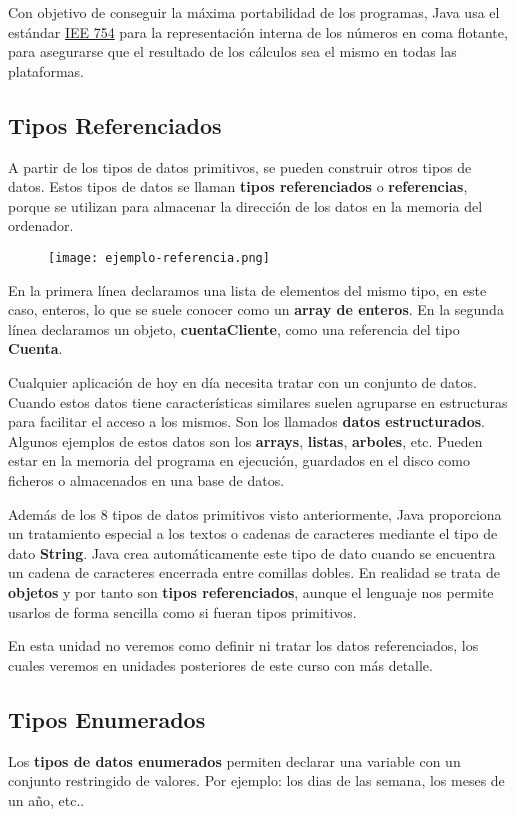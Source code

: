 Con objetivo de conseguir la máxima portabilidad de los programas, Java usa el estándar \href{https://grouper.ieee.org/groups/msc/ANSI_IEEE-Std-754-2019/}{IEE 754} para la representación interna de los números en coma flotante, para asegurarse que el resultado de los cálculos sea el mismo en todas las plataformas.

\subsection{Tipos Referenciados}
A partir de los tipos de datos primitivos, se pueden construir otros tipos de datos. Estos tipos de datos se llaman \textbf{tipos referenciados} o \textbf{referencias}, porque se utilizan para almacenar la dirección de los datos en la memoria del ordenador.

\begin{figure}[H]
    \texttt{[image: ejemplo-referencia.png]}
\end{figure}

En la primera línea declaramos una lista de elementos del mismo tipo, en este caso, enteros, lo que se suele conocer como un \textbf{array de enteros}. En la segunda línea declaramos un objeto, \textbf{cuentaCliente}, como una referencia del tipo \textbf{Cuenta}.

Cualquier aplicación de hoy en día necesita tratar con un conjunto de datos. Cuando estos datos tiene características similares suelen agruparse en estructuras para facilitar el acceso a los mismos. Son los llamados \textbf{datos estructurados}. Algunos ejemplos de estos datos son los \textbf{arrays}, \textbf{listas}, \textbf{arboles}, etc. Pueden estar en la memoria del programa en ejecución,	guardados en el disco como ficheros o almacenados en una base de datos.

Además de los 8 tipos de datos primitivos visto anteriormente, Java proporciona un tratamiento especial a los textos o cadenas de caracteres mediante el tipo de dato \textbf{String}. Java crea automáticamente este tipo de dato cuando se encuentra un cadena de caracteres encerrada entre comillas dobles. En realidad se trata de \textbf{objetos} y por tanto son \textbf{tipos referenciados}, aunque el lenguaje nos permite usarlos de forma sencilla como si fueran tipos primitivos.

En esta unidad no veremos como definir ni tratar los datos referenciados, los cuales veremos en unidades posteriores de este curso con más detalle.

\subsection{Tipos Enumerados}
Los \textbf{tipos de datos enumerados} permiten declarar una variable con un conjunto restringido de valores. Por ejemplo: los dias de las semana, los meses de un año, etc..

